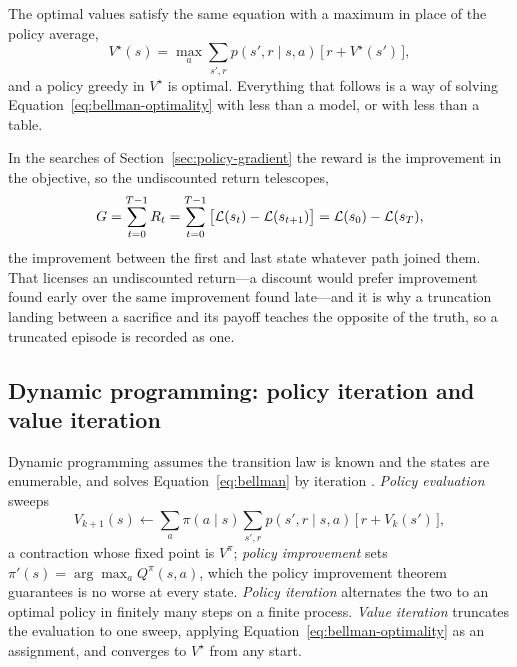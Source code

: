 \documentclass[11pt,a4paper]{article}
\begin{document}
The optimal values satisfy the same equation with a maximum in place of the
policy average,
\begin{equation}
  V^{\star}(s) = \max_{a} \sum_{s', r} p(s', r \mid s, a)\,
    \big[\, r + V^{\star}(s') \,\big],
  \label{eq:bellman-optimality}
\end{equation}
and a policy greedy in $V^{\star}$ is optimal. Everything that follows is a
way of solving Equation~\ref{eq:bellman-optimality} with less than a model, or
with less than a table.

In the searches of Section~\ref{sec:policy-gradient} the reward is the
improvement in the objective, so the undiscounted return telescopes,
\begin{equation}
  G = \sum_{t=0}^{T-1} R_t
    = \sum_{t=0}^{T-1} \big[\mathcal{L}(s_t) - \mathcal{L}(s_{t+1})\big]
    = \mathcal{L}(s_0) - \mathcal{L}(s_T),
  \label{eq:return}
\end{equation}
the improvement between the first and last state whatever path joined them.
That licenses an undiscounted return---a discount would prefer improvement
found early over the same improvement found late---and it is why a truncation
landing between a sacrifice and its payoff teaches the opposite of the truth,
so a truncated episode is recorded as one.

\subsection{Dynamic programming: policy iteration and value iteration}
\label{app:rl:dp}

Dynamic programming assumes the transition law is known and the states are
enumerable, and solves Equation~\ref{eq:bellman} by iteration
\citep[Ch.~4]{suttonbarto2018}. \emph{Policy evaluation} sweeps
\begin{equation}
  V_{k+1}(s) \gets \sum_{a} \pi(a \mid s) \sum_{s', r}
    p(s', r \mid s, a)\,\big[\, r + V_{k}(s') \,\big],
  \label{eq:policy-evaluation}
\end{equation}
a contraction whose fixed point is $V^{\pi}$; \emph{policy improvement} sets
$\pi'(s) = \arg\max_a Q^{\pi}(s, a)$, which the policy improvement theorem
guarantees is no worse at every state. \emph{Policy iteration} alternates the
two to an optimal policy in finitely many steps on a finite process.
\emph{Value iteration} truncates the evaluation to one sweep, applying
Equation~\ref{eq:bellman-optimality} as an assignment, and converges to
$V^{\star}$ from any start.
\end{document}
